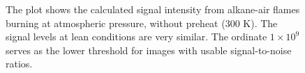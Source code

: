 \begin{figure}

\centering



\caption[- alkane-air flame results - I]{The plot shows the calculated signal intensity from alkane-air flames burning at atmospheric pressure, without preheat (300 K). The signal levels at lean conditions are very similar. The ordinate \(1\times10^9\) serves as the lower threshold for images with usable signal-to-noise ratios.}

\label{fig:c1c3}

\end{figure}
